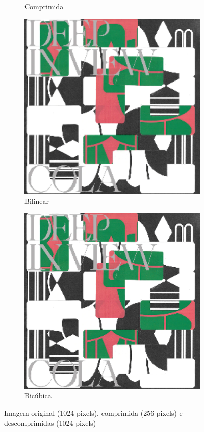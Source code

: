 \documentclass{article}
\begin{document}
\begin{figure}[ht]
\begin{subfigure}{0.48\textwidth}
    \caption{Comprimida}
  \end{subfigure}%
  \hfill
  \begin{subfigure}{0.48\textwidth}
    \centering
    \includegraphics[width=\textwidth]{imagens-reais/deep-in-view/decompressed-bilinear.png}
    \caption{Bilinear}
  \end{subfigure}%
  \hfill
  \begin{subfigure}{0.48\textwidth}
    \centering
    \includegraphics[width=\textwidth]{imagens-reais/deep-in-view/decompressed-bicubica.png}
    \caption{Bicúbica}
  \end{subfigure}
  \caption{Imagem original (1024 pixels), comprimida (256 pixels) e descomprimidas (1024 pixels)}
\end{figure}
\end{document}
